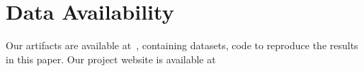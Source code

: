 \section*{Data Availability}
\label{data}
Our artifacts are available at~\cite{Data}, containing datasets, code to reproduce the results in this paper. Our project website is available at ~\cite{CodeImprove}


